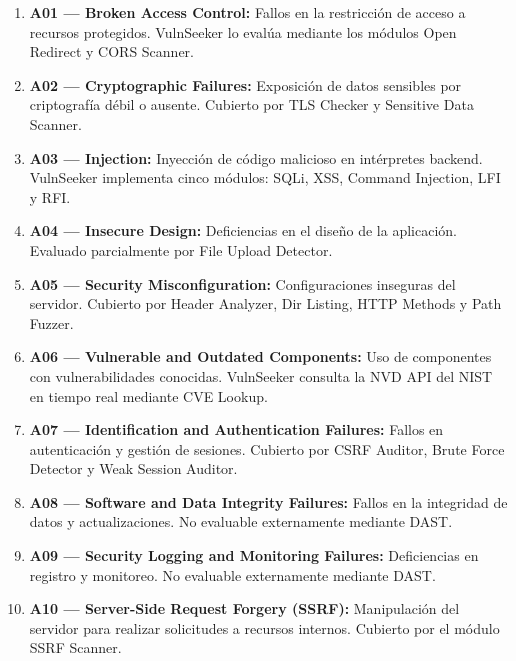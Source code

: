 \documentclass[12pt, a4paper]{article}
\begin{document}
\begin{enumerate}
    \item \textbf{A01 — Broken Access Control:} Fallos en la restricción de
    acceso a recursos protegidos. VulnSeeker lo evalúa mediante los módulos
    Open Redirect y CORS Scanner.

    \item \textbf{A02 — Cryptographic Failures:} Exposición de datos sensibles
    por criptografía débil o ausente. Cubierto por TLS Checker y Sensitive Data
    Scanner.

    \item \textbf{A03 — Injection:} Inyección de código malicioso en intérpretes
    backend. VulnSeeker implementa cinco módulos: SQLi, XSS, Command Injection,
    LFI y RFI.

    \item \textbf{A04 — Insecure Design:} Deficiencias en el diseño de la
    aplicación. Evaluado parcialmente por File Upload Detector.

    \item \textbf{A05 — Security Misconfiguration:} Configuraciones inseguras
    del servidor. Cubierto por Header Analyzer, Dir Listing, HTTP Methods
    y Path Fuzzer.

    \item \textbf{A06 — Vulnerable and Outdated Components:} Uso de componentes
    con vulnerabilidades conocidas. VulnSeeker consulta la NVD API del NIST en
    tiempo real mediante CVE Lookup.

    \item \textbf{A07 — Identification and Authentication Failures:} Fallos en
    autenticación y gestión de sesiones. Cubierto por CSRF Auditor, Brute Force
    Detector y Weak Session Auditor.

    \item \textbf{A08 — Software and Data Integrity Failures:} Fallos en la
    integridad de datos y actualizaciones. No evaluable externamente mediante
    DAST.

    \item \textbf{A09 — Security Logging and Monitoring Failures:} Deficiencias
    en registro y monitoreo. No evaluable externamente mediante DAST.

    \item \textbf{A10 — Server-Side Request Forgery (SSRF):} Manipulación del
    servidor para realizar solicitudes a recursos internos. Cubierto por el
    módulo SSRF Scanner.
\end{enumerate}
\end{document}

